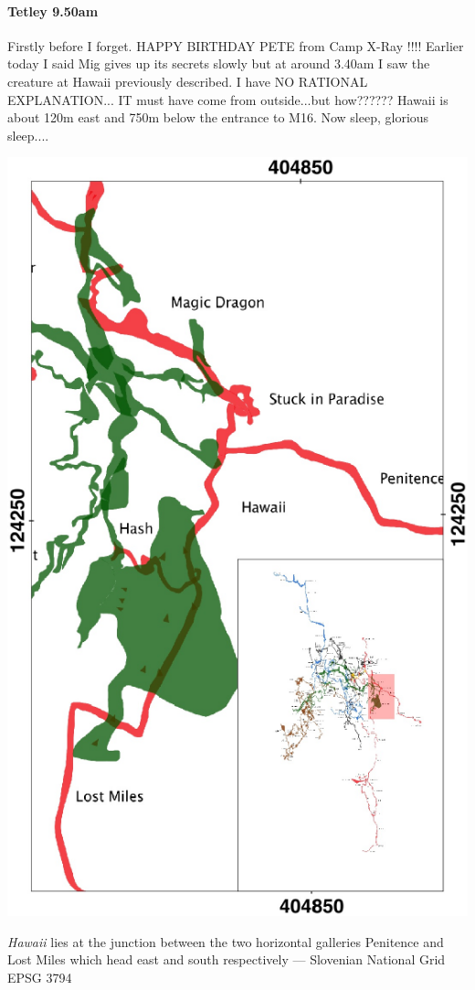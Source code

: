 \paragraph{Tetley 9.50am}
Firstly before I forget.
HAPPY BIRTHDAY PETE
from Camp X-Ray !!!!
Earlier today I said Mig gives up its secrets slowly but at around 3.40am I saw the creature at Hawaii previously described. I have NO RATIONAL EXPLANATION... IT must have come from outside...but how??????
Hawaii is about 120m east and 750m below the entrance to M16. Now sleep, glorious sleep....

\begin{marginfigure}
\checkoddpage \ifoddpage \forcerectofloat \else \forceversofloat \fi
\centering
\includegraphics[width=\textwidth]{images/2013/tetley-sam-2013/hawaii_inset.pdf}
\caption{\emph{Hawaii} lies at the junction between the two horizontal galleries Penitence and Lost Miles which head east and south  respectively --- Slovenian National Grid EPSG 3794 }
\label{hawaii inset}
\end{marginfigure}

